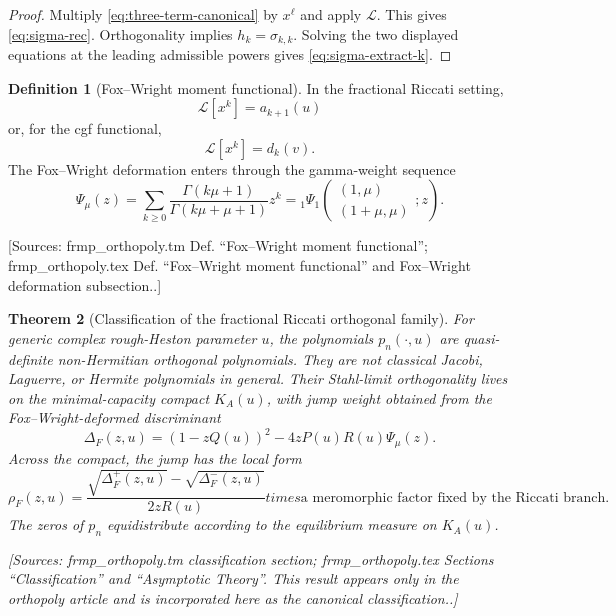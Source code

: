 \documentclass[11pt]{article}
\newtheorem{theorem}{Theorem}[section]
\theoremstyle{definition}
\newtheorem{definition}[theorem]{Definition}
\newcommand{\Lc}{\mathcal{L}}
\newcommand{\Source}[1]{\par\smallskip\noindent\textup{[Sources: #1.]}}
\begin{document}
\begin{proof}
Multiply \eqref{eq:three-term-canonical} by $x^\ell$ and apply $\Lc$.
This gives \eqref{eq:sigma-rec}.
Orthogonality implies $h_k=\sigma_{k,k}$.
Solving the two displayed equations at the leading admissible powers gives \eqref{eq:sigma-extract-k}.
\end{proof}

\begin{definition}[Fox--Wright moment functional]\label{def:fox-wright-functional}
In the fractional Riccati setting,
\begin{equation}\label{eq:fw-moments}
        \Lc[x^k]=a_{k+1}(u)
\end{equation}
or,
for the cgf functional,
\begin{equation}\label{eq:fw-moments-d}
        \Lc[x^k]=d_k(v).
\end{equation}
The Fox--Wright deformation enters through the gamma-weight sequence
\begin{equation}\label{eq:psi-mu}
        \Psi_{\mu}(z)=\sum_{k\ge0}\frac{\Gamma(k\mu+1)}{\Gamma(k\mu+\mu+1)}z^k
        ={}_1\Psi_1\!\left(\begin{matrix}(1,\mu)\\(1+\mu,\mu)\end{matrix};z\right).
\end{equation}
\Source{frmp\_orthopoly.tm Def. ``Fox--Wright moment functional''; frmp\_orthopoly.tex Def. ``Fox--Wright moment functional'' and Fox--Wright deformation subsection.}
\end{definition}

\begin{theorem}[Classification of the fractional Riccati orthogonal family]\label{thm:fw-classification}
For generic complex rough-Heston parameter $u$,
the polynomials $p_n(\cdot,u)$ are quasi-definite non-Hermitian orthogonal polynomials.
They are not classical Jacobi,
Laguerre,
or Hermite polynomials in general.
Their Stahl-limit orthogonality lives on the minimal-capacity compact $K_A(u)$,
with jump weight obtained from the Fox--Wright-deformed discriminant
\begin{equation}\label{eq:fw-discriminant}
        \Delta_F(z,u)=(1-zQ(u))^2-4zP(u)R(u)\Psi_{\mu}(z).
\end{equation}
Across the compact,
the jump has the local form
\begin{equation}\label{eq:fw-jump}
        \rho_F(z,u)=\frac{\sqrt{\Delta_F^+(z,u)}-\sqrt{\Delta_F^-(z,u)}}{2zR(u)}
	times \text{a meromorphic factor fixed by the Riccati branch}.
\end{equation}
The zeros of $p_n$ equidistribute according to the equilibrium measure on $K_A(u)$.
\Source{frmp\_orthopoly.tm classification section; frmp\_orthopoly.tex Sections ``Classification'' and ``Asymptotic Theory''. This result appears only in the orthopoly article and is incorporated here as the canonical classification.}
\end{theorem}
\end{document}
